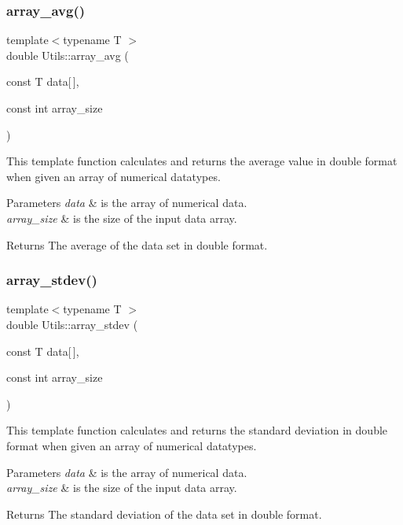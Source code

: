 \subsubsection{\texorpdfstring{array\+\_\+avg()}{array\_avg()}}
{\footnotesize\ttfamily template$<$typename T $>$ \\
double Utils\+::array\+\_\+avg (\begin{DoxyParamCaption}\item[{const T}]{data\mbox{[}$\,$\mbox{]},  }\item[{const int}]{array\+\_\+size }\end{DoxyParamCaption})}



This template function calculates and returns the average value in double format when given an array of numerical datatypes. 


\begin{DoxyParams}{Parameters}
{\em data} & is the array of numerical data. \\
\hline
{\em array\+\_\+size} & is the size of the input data array. \\
\hline
\end{DoxyParams}
\begin{DoxyReturn}{Returns}
The average of the data set in double format. 
\end{DoxyReturn}
\mbox{\label{namespace_utils_a25d09c704b5ae03f01cf76b6de10aa19}} 
\subsubsection{\texorpdfstring{array\+\_\+stdev()}{array\_stdev()}}
{\footnotesize\ttfamily template$<$typename T $>$ \\
double Utils\+::array\+\_\+stdev (\begin{DoxyParamCaption}\item[{const T}]{data\mbox{[}$\,$\mbox{]},  }\item[{const int}]{array\+\_\+size }\end{DoxyParamCaption})}



This template function calculates and returns the standard deviation in double format when given an array of numerical datatypes. 


\begin{DoxyParams}{Parameters}
{\em data} & is the array of numerical data. \\
\hline
{\em array\+\_\+size} & is the size of the input data array. \\
\hline
\end{DoxyParams}
\begin{DoxyReturn}{Returns}
The standard deviation of the data set in double format. 
\end{DoxyReturn}
\mbox{\label{namespace_utils_ad895b1edcec8254af3279938d0ed4ac0}} 

